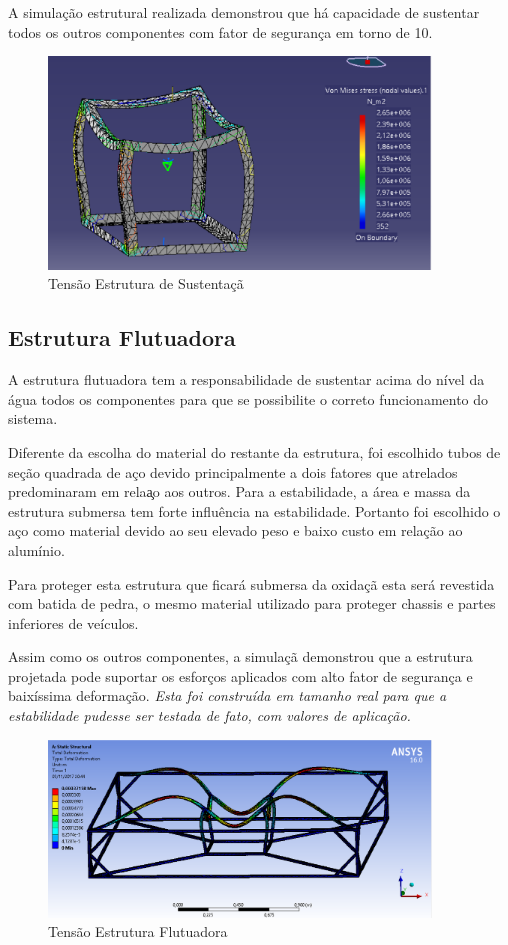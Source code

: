A simula\c{c}\~{a}o estrutural realizada demonstrou que h\'{a} capacidade de sustentar todos os outros componentes com fator de seguran\c{c}a em torno de 10.


\begin{figure}
\centering
\includegraphics[width=4in]{figuras/Sustentacao_tensao}
\caption{Tens\~{a}o Estrutura de Sustenta\c{c}\~{a}}
\end{figure}

\subsection{Estrutura Flutuadora}

A estrutura flutuadora tem a responsabilidade de sustentar acima do n\'{i}vel da \'{a}gua todos os componentes para que se possibilite o correto funcionamento do sistema.

Diferente da escolha do material do restante da estrutura, foi escolhido tubos de se\c{c}\~{a}o quadrada de a\c{c}o devido principalmente a dois fatores que atrelados predominaram em rela\c{a}o aos outros. Para a estabilidade, a \'{a}rea e massa da estrutura submersa tem forte influ\^{e}ncia na estabilidade. Portanto foi escolhido o a\c{c}o como material devido ao seu elevado peso e baixo custo em rela\c{c}\~{a}o ao alum\'{i}nio.

Para proteger esta estrutura que ficar\'{a} submersa da oxida\c{c}\~{a} esta ser\'{a} revestida com batida de pedra, o mesmo material utilizado para proteger chassis e partes inferiores de ve\'{i}culos.

Assim como os outros componentes, a simula\c{c}\~{a} demonstrou que a estrutura projetada pode suportar os esfor\c{c}os aplicados com alto fator de seguran\c{c}a e baix\'{i}ssima deforma\c{c}\~{a}o. \textit{Esta foi constru\'{i}da em tamanho real para que a estabilidade pudesse ser testada de fato, com valores de aplica\c{c}\~{a}o.}\\

\begin{figure}
  \centering
  \includegraphics[width=4in]{figuras/Deformacao_EstruturaSust}
  \caption{Tens\~{a}o Estrutura Flutuadora}
\end{figure}
